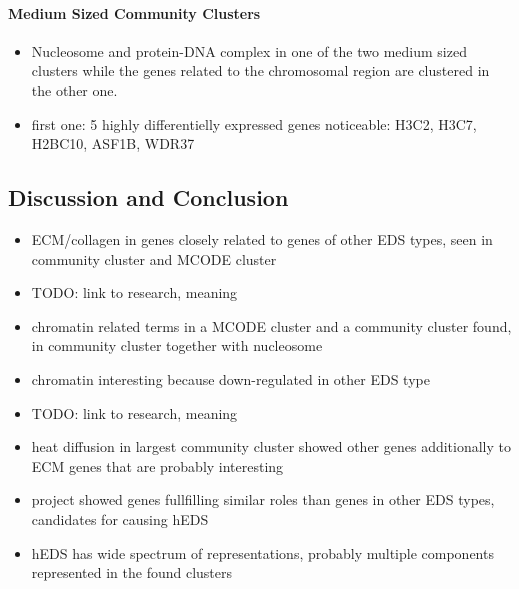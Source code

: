 \paragraph{Medium Sized Community Clusters}

\begin{itemize}
	\item Nucleosome and protein-DNA complex in one of the two medium sized clusters while the genes related to the chromosomal region are clustered in the other one.
	\item first one: 5 highly differentielly expressed genes noticeable: H3C2, H3C7, H2BC10, ASF1B, WDR37
\end{itemize}


\subsection{Discussion and Conclusion}

\begin{itemize}
	\item ECM/collagen in genes closely related to genes of other EDS types, seen in community cluster and MCODE cluster
	\item TODO: link to research, meaning
	\item chromatin related terms in a MCODE cluster and a community cluster found, in community cluster together with nucleosome
	\item chromatin interesting because down-regulated in other EDS type
	\item TODO: link to research, meaning
	\item heat diffusion in largest community cluster showed other genes additionally to ECM genes that are probably interesting
	\item project showed genes fullfilling similar roles than genes in other EDS types, candidates for causing hEDS
	\item hEDS has wide spectrum of representations, probably multiple components represented in the found clusters
\end{itemize}

